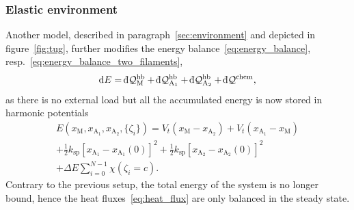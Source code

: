 \documentclass[aps,pre,twocolumn,showpacs,showkeys,superscriptaddress,floatfix]{revtex4-1}
\newcommand{\rmd}{{\mathrm d}}
\newcommand{\dbar}{{\mathchar '26 \mkern-11mu {\mathrm d}}}
\begin{document}
\subsubsection{Elastic environment}
\label{sec:power_elastic}
Another model, described in paragraph~\ref{sec:environment} and depicted in figure~\ref{fig:tug}, 
further modifies the energy balance~\eqref{eq:energy_balance}, resp.~\eqref{eq:energy_balance_two_filaments},
\begin{equation*}
\rmd E = \dbar {\mathcal Q}_\text{M}^\text{hb} + \dbar {\mathcal Q}_{\text{A}_1}^\text{hb} + \dbar {\mathcal Q}_{\text{A}_2}^\text{hb} + \dbar {\mathcal Q}^\text{chem}, 
\end{equation*}
as there is no external load but all the accumulated energy is now stored in harmonic potentials 
\begin{multline*}
E( x_\text{M}, x_{\text{A}_1}, x_{\text{A}_2}, \{ \zeta_i \}) 
= V_t( x_\text{M} - x_{\text{A}_2} ) 
+ V_t( x_{\text{A}_1} - x_\text{M} ) 
\\
+ \frac{1}{2} k_\text{sp} \left[ x_{\text{A}_1} - x_{\text{A}_1}(0) \right]^2 
+ \frac{1}{2} k_\text{sp} \left[ x_{\text{A}_2} - x_{\text{A}_2}(0) \right]^2 
\\
+ \Delta E \sum\limits_{i=0}^{N-1} \chi( \zeta_i = c ) .
\end{multline*}
Contrary to the previous setup, the total energy of the system is no longer bound, hence the heat fluxes~\eqref{eq:heat_flux} are only balanced in the steady state.
\end{document}
